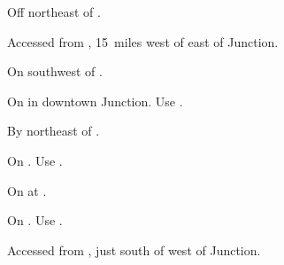 
\begin{LocationList}

Off  northeast of .

Accessed from , 15~miles west of  east of Junction.

On  southwest of .

On  in downtown Junction.
Use  .

By  northeast of .

\Location{\TruckService \Service}
On .
Use  .

\Location{\TruckStop \Gas \Rest \Weigh}
On  at  .

On .
Use  .

Accessed from , just south of  west of Junction.

\end{LocationList}
